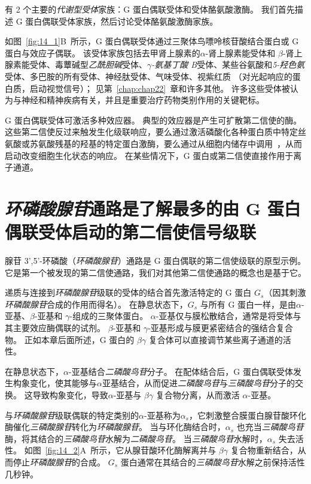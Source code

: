 有 2 个主要的\textit{代谢型受体}家族：G 蛋白偶联受体和受体酪氨酸激酶。
我们首先描述 G 蛋白偶联受体家族，然后讨论受体酪氨酸激酶家族。


如图~\ref{fig:14_1}B~所示，G 蛋白偶联受体通过三聚体鸟嘌呤核苷酸结合蛋白或 G 蛋白与效应子偶联。
该受体家族包括去甲肾上腺素的$\alpha$-肾上腺素能受体和 $\beta$-肾上腺素能受体、毒蕈碱型\textit{乙酰胆碱}受体、\textit{$\gamma$-氨基丁酸 B}受体、某些谷氨酸和\textit{5-羟色氨}受体、多巴胺的所有受体、神经肽受体、气味受体、视紫红质 （对光起响应的蛋白质，启动视觉信号）；
见第~\ref{chap:chap22}~章和许多其他。
许多这些受体被认为与神经和精神疾病有关，并且是重要治疗药物类别作用的关键靶标。


G 蛋白偶联受体可激活多种效应器。
典型的效应器是产生可扩散第二信使的酶。
这些第二信使反过来触发生化级联响应，要么通过激活磷酸化各种蛋白质中特定丝氨酸或苏氨酸残基的羟基的特定蛋白激酶，要么通过从细胞内储存中调用~，从而启动改变细胞生化状态的响应。
在某些情况下，G 蛋白或第二信使直接作用于离子通道。



\section{\textit{环磷酸腺苷}通路是了解最多的由 G 蛋白偶联受体启动的第二信使信号级联}

腺苷 3',5'-环磷酸（\textit{环磷酸腺苷}）通路是 G 蛋白偶联的第二信使级联的原型示例。
它是第一个被发现的第二信使通路，我们对其他第二信使通路的概念也是基于它。


递质与连接到\textit{环磷酸腺苷}级联的受体的结合首先激活特定的 G 蛋白 $ G_s $（因其刺激\textit{环磷酸腺苷}合成的作用而得名）。
在静息状态下，$ G_s $ 与所有 G 蛋白一样，是由$\alpha$-亚基、$\beta$-亚基和 $\gamma$-组成的三聚体蛋白。
$\alpha$-亚基仅与膜松散结合，通常是将受体与其主要效应酶偶联的试剂。
$\beta$-亚基和 $\gamma$-亚基形成与膜更紧密结合的强结合复合物。
正如本章后面所述，G 蛋白的 $\beta \gamma$ 复合体可以直接调节某些离子通道的活性。


在静息状态下，$\alpha$-亚基结合\textit{二磷酸鸟苷}分子。
在配体结合后，G 蛋白偶联受体发生构象变化，使其能够与$\alpha$亚基结合，从而促进\textit{二磷酸鸟苷}与\textit{三磷酸鸟苷}分子的交换。
这导致构象变化，导致$\alpha$-亚基与 $\beta \gamma$ 复合物分离，从而激活 $\alpha$-亚基。


与\textit{环磷酸腺苷}级联偶联的特定类别的$\alpha$-亚基称为$\alpha_s$，它刺激整合膜蛋白腺苷酸环化酶催化\textit{三磷酸腺苷}转化为\textit{环磷酸腺苷}。
当与环化酶结合时，$\alpha_s$ 也充当\textit{三磷酸鸟苷}酶，将其结合的\textit{三磷酸鸟苷}水解为\textit{二磷酸鸟苷}。
当\textit{三磷酸鸟苷}水解时，$\alpha_s$ 失去活性。
如图~\ref{fig:14_2}A~所示，它从腺苷酸环化酶解离并与 $\beta \gamma$ 复合物重新结合，从而停止\textit{环磷酸腺苷}的合成。
$ G_s $ 蛋白通常在其结合的\textit{三磷酸鸟苷}水解之前保持活性几秒钟。


